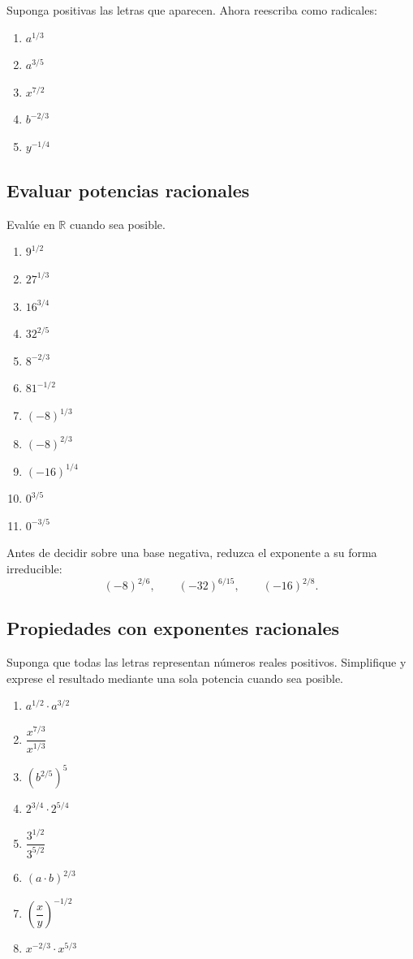 Suponga positivas las letras que aparecen. Ahora reescriba como radicales:

\begin{enumerate}
\item \(a^{1/3}\)
\item \(a^{3/5}\)
\item \(x^{7/2}\)
\item \(b^{-2/3}\)
\item \(y^{-1/4}\)
\end{enumerate}

\subsection*{Evaluar potencias racionales}

Evalúe en \(\mathbb R\) cuando sea posible.

\begin{enumerate}
\item \(9^{1/2}\)
\item \(27^{1/3}\)
\item \(16^{3/4}\)
\item \(32^{2/5}\)
\item \(8^{-2/3}\)
\item \(81^{-1/2}\)
\item \((-8)^{1/3}\)
\item \((-8)^{2/3}\)
\item \((-16)^{1/4}\)
\item \(0^{3/5}\)
\item \(0^{-3/5}\)
\end{enumerate}

Antes de decidir sobre una base negativa, reduzca el exponente a su forma irreducible:
\[
(-8)^{2/6},
\qquad
(-32)^{6/15},
\qquad
(-16)^{2/8}.
\]

\subsection*{Propiedades con exponentes racionales}

Suponga que todas las letras representan números reales positivos. Simplifique y exprese el resultado mediante una sola potencia cuando sea posible.

\begin{enumerate}
\item \(a^{1/2}\cdot a^{3/2}\)
\item \(\dfrac{x^{7/3}}{x^{1/3}}\)
\item \((b^{2/5})^5\)
\item \(2^{3/4}\cdot2^{5/4}\)
\item \(\dfrac{3^{1/2}}{3^{5/2}}\)
\item \((a\cdot b)^{2/3}\)
\item \(\left(\dfrac xy\right)^{-1/2}\)
\item \(x^{-2/3}\cdot x^{5/3}\)
\end{enumerate}


